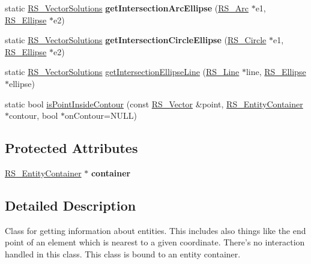 \begin{DoxyCompactItemize}
\item 
\hypertarget{classRS__Information_ab600a152a9f0cb2b547c9f3b96df05f4}{static \hyperlink{classRS__VectorSolutions}{R\-S\-\_\-\-Vector\-Solutions} {\bfseries get\-Intersection\-Arc\-Ellipse} (\hyperlink{classRS__Arc}{R\-S\-\_\-\-Arc} $\ast$e1, \hyperlink{classRS__Ellipse}{R\-S\-\_\-\-Ellipse} $\ast$e2)}\label{classRS__Information_ab600a152a9f0cb2b547c9f3b96df05f4}

\item 
\hypertarget{classRS__Information_abefb274bc3cc063a99e40d72a0dc6c57}{static \hyperlink{classRS__VectorSolutions}{R\-S\-\_\-\-Vector\-Solutions} {\bfseries get\-Intersection\-Circle\-Ellipse} (\hyperlink{classRS__Circle}{R\-S\-\_\-\-Circle} $\ast$e1, \hyperlink{classRS__Ellipse}{R\-S\-\_\-\-Ellipse} $\ast$e2)}\label{classRS__Information_abefb274bc3cc063a99e40d72a0dc6c57}

\item 
static \hyperlink{classRS__VectorSolutions}{R\-S\-\_\-\-Vector\-Solutions} \hyperlink{classRS__Information_a549a52318ca2277993b987aa2f980259}{get\-Intersection\-Ellipse\-Line} (\hyperlink{classRS__Line}{R\-S\-\_\-\-Line} $\ast$line, \hyperlink{classRS__Ellipse}{R\-S\-\_\-\-Ellipse} $\ast$ellipse)
\item 
static bool \hyperlink{classRS__Information_a2192a8e35849d1368fca3b98d2650b6e}{is\-Point\-Inside\-Contour} (const \hyperlink{classRS__Vector}{R\-S\-\_\-\-Vector} \&point, \hyperlink{classRS__EntityContainer}{R\-S\-\_\-\-Entity\-Container} $\ast$contour, bool $\ast$on\-Contour=N\-U\-L\-L)
\end{DoxyCompactItemize}
\subsection*{Protected Attributes}
\begin{DoxyCompactItemize}
\item 
\hypertarget{classRS__Information_acf0965edf2e51cefc2b8996612ffa5ef}{\hyperlink{classRS__EntityContainer}{R\-S\-\_\-\-Entity\-Container} $\ast$ {\bfseries container}}\label{classRS__Information_acf0965edf2e51cefc2b8996612ffa5ef}

\end{DoxyCompactItemize}


\subsection{Detailed Description}
Class for getting information about entities. This includes also things like the end point of an element which is nearest to a given coordinate. There's no interaction handled in this class. This class is bound to an entity container.

